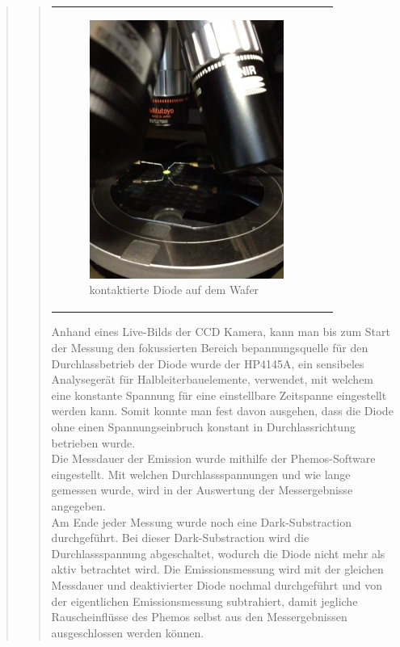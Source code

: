\begin{quote}
\begin{quote}
\begin{center}
\begin{tabular}{ll}
\begin{minipage}{0.6\textwidth}
                        \begin{figure}[H]
                            \label{fig:}
                            \includegraphics[scale=0.7, trim = 0cm 0cm 0cm
                            0cm, clip]{./Emissionsbilder/restliches/phemos2.JPG}
                            \caption{kontaktierte Diode auf dem Wafer}
                        \end{figure}
                    \vspace{-1.5em}
    
                    \end{minipage}
    
                \end{tabular}
                \end{center}
        
        \vspace{2em}
        
        Anhand eines Live-Bilds der CCD Kamera, kann man bis zum Start der
        Messung den fokussierten Bereich bepannungsquelle für den
        Durchlassbetrieb der Diode wurde der HP4145A, ein sensibeles
        Analysegerät für Halbleiterbauelemente, verwendet, mit welchem eine
        konstante Spannung für eine einstellbare Zeitspanne eingestellt werden
        kann. Somit konnte man fest davon ausgehen, dass die Diode ohne einen
        Spannungseinbruch konstant in Durchlassrichtung betrieben wurde.\\
        Die Messdauer der Emission wurde mithilfe der Phemos-Software
        eingestellt. Mit welchen Durchlassspannungen und wie lange gemessen
        wurde, wird in der Auswertung der Messergebnisse angegeben.\\
        Am Ende jeder Messung wurde noch eine Dark-Substraction durchgeführt.
        Bei dieser Dark-Substraction wird die Durchlassspannung abgeschaltet,
        wodurch die Diode nicht mehr als aktiv betrachtet wird. Die Emissionsmessung wird mit der
        gleichen Messdauer und deaktivierter Diode nochmal durchgeführt und von
        der eigentlichen Emissionsmessung subtrahiert, damit jegliche
        Rauscheinflüsse des Phemos selbst aus den Messergebnissen ausgeschlossen
        werden können. 
        

\end{quote}
\end{quote}
